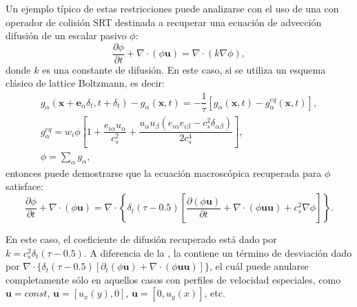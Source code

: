 Un ejemplo t\'ipico de estas restricciones puede analizarse con el uso de una \lbe{} con operador de colisi\'on SRT destinada a recuperar una ecuaci\'on de advecci\'on difusi\'on de un escalar pasivo $\phi$: 
\begin{equation}
	\dfrac{\partial \phi}{\partial t} + \nabla \cdot (\phi \bm{u}) = \nabla \cdot (k \nabla \phi),
	\label{eq:adv_dif_phi}
\end{equation}
donde $k$ es una constante de difusi\'on. En este caso, si se utiliza un esquema cl\'asico de lattice Boltzmann, es decir:
\begin{equation}
	\begin{gathered}
		g_{\alpha}(\bm{x}+\bm{e}_{\alpha}\delta_t, t+\delta_t) - g_{\alpha}(\bm{x},t) = -\dfrac{1}{\tau} \left[ g_{\alpha}(\bm{x},t) - g^{eq}_{\alpha}(\bm{x},t) \right], \\[2mm]
		g_{\alpha}^{eq} = w_i \phi \left[ 1 + \dfrac{e_{i\alpha}u_{\alpha}}{c_s^2} + \dfrac{u_{\alpha}u_{\beta}(e_{i\alpha}e_{i\beta}-c_s^2\delta_{\alpha\beta})}{2c_s^4} \right], \\[2mm]
		\phi = \sum_{\alpha} g_{\alpha},
	\end{gathered}
\end{equation}
entonces puede demostrarse que la ecuaci\'on macrosc\'opica recuperada para $\phi$ satisface:
\begin{equation}
	\dfrac{\partial \phi}{\partial t} + \nabla \cdot (\phi \bm{u}) = \nabla \cdot \left\{ \delta_t(\tau - 0.5) \left[ \dfrac{\partial (\phi\bm{u})}{\partial t} + \nabla \cdot (\phi \bm{uu}) + c_s^2 \nabla \phi\right]\right\}.
	\label{eq:adv_dif_phi_rec}
\end{equation}

En este caso, el coeficiente de difusi\'on recuperado est\'a dado por $k=c_s^2 \delta_t(\tau-0.5)$. A diferencia de la , la  contiene un t\'ermino de desviaci\'on dado por $\nabla \cdot \{ \delta_t(\tau - 0.5) [ \partial_t (\phi\bm{u}) + \nabla \cdot (\phi \bm{uu}) ]\}$, el cu\'al puede anularse completamente s\'olo en aquellos casos con perfiles de velocidad especiales, como $\bm{u}=const$, $\bm{u}=[u_x(y),0]$, $\bm{u}=[0,u_y(x)]$, etc. 

